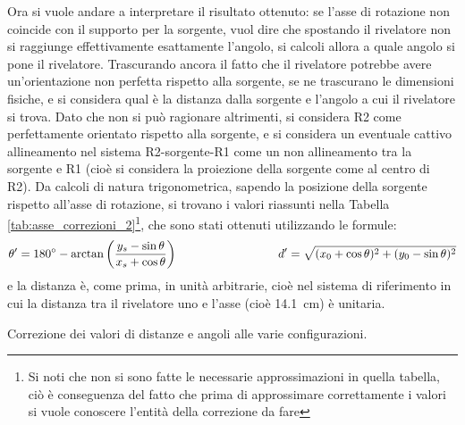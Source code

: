 Ora si vuole andare a interpretare il risultato ottenuto: se l'asse di rotazione non coincide con il supporto per la sorgente, vuol dire che spostando il rivelatore non
si raggiunge effettivamente esattamente l'angolo, si calcoli allora a quale angolo si pone il rivelatore. Trascurando ancora il fatto che il rivelatore potrebbe avere
un'orientazione non perfetta rispetto alla sorgente, se ne trascurano le dimensioni fisiche, e si considera qual è la distanza dalla sorgente e l'angolo a cui il rivelatore
si trova. Dato che non si può ragionare altrimenti, si considera R2 come perfettamente orientato rispetto alla sorgente, e si considera un eventuale cattivo allineamento
nel sistema R2-sorgente-R1 come un non allineamento tra la sorgente e R1 (cioè si considera la proiezione della sorgente come al centro di R2). Da calcoli di natura
trigonometrica, sapendo la posizione della sorgente rispetto all'asse di rotazione, si trovano i valori riassunti nella Tabella \ref{tab:asse_correzioni_2}\footnote{Si noti
che non si sono fatte le necessarie approssimazioni in quella tabella, ciò è conseguenza del fatto che prima di approssimare correttamente i valori si vuole conoscere 
l'entità della correzione da fare}, che sono stati ottenuti utilizzando le formule:
$$\theta' = 180^\circ -\arctan\left(\frac{y_s-\sin\theta}{x_s+\cos\theta}\right) \hspace{3 cm} d' = \sqrt{(x_0+\cos\theta)^2+(y_0-\sin\theta)^2}$$
e la distanza è, come prima, in unità arbitrarie, cioè nel sistema di riferimento in cui la distanza tra il rivelatore uno e l'asse (cioè 14.1~cm) è unitaria.
%
\begin{table}[h]
	\centering
	
	\caption{Correzione dei valori di distanze e angoli alle varie configurazioni.}
	\label{tab:asse_correzioni_2}
\end{table}
%